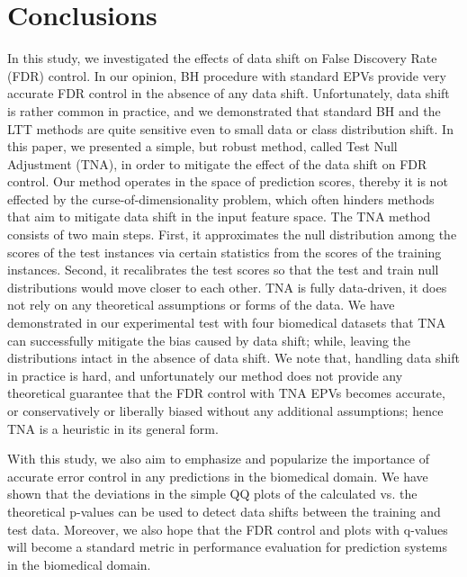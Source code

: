 \documentclass{article}
\begin{document}
\section{Conclusions}


In this study, we investigated the effects of data shift on False Discovery Rate (FDR) control. In our opinion, BH procedure with standard EPVs provide very accurate FDR control in the absence of any data shift. Unfortunately, data shift is rather common in practice, and we demonstrated that standard BH and the LTT methods are quite sensitive even to small data or class distribution shift. In this paper, we presented a simple, but robust method, called Test Null Adjustment (TNA), in order to mitigate the effect of the data shift on FDR control. Our method operates in the space of prediction scores, thereby it is not effected by the curse-of-dimensionality problem, which often hinders methods that aim to mitigate data shift in the input feature space. The TNA method consists of two main steps. First, it approximates the null distribution among the scores of the test instances via certain statistics from the scores of the training instances. Second, it recalibrates the test scores so that the test and train null distributions would move closer to each other. TNA is fully data-driven, it does not rely on any theoretical assumptions or forms of the data. We have demonstrated in our experimental test with four biomedical datasets that TNA can successfully mitigate the bias caused by data shift; while, leaving the distributions intact in the absence of data shift. We note that, handling data shift in practice is hard, and unfortunately our method does not provide any theoretical guarantee that the FDR control with TNA EPVs becomes accurate, or conservatively or liberally biased without any additional assumptions; hence TNA is a heuristic in its general form.  

With this study, we also aim to emphasize and popularize the importance of accurate error control in any predictions in the biomedical domain. We have shown that the deviations in the simple QQ plots of the calculated vs. the theoretical p-values can be used to detect data shifts between the training and test data. Moreover, we also hope that the FDR control and plots with q-values will become a standard metric in performance evaluation for prediction systems in the biomedical domain.





\end{document}
